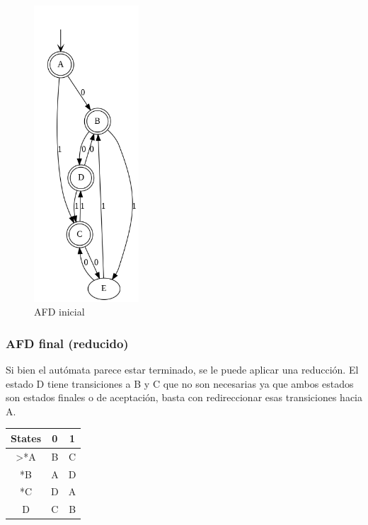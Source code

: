\documentclass[https://www.overleaf.com/project/63761df255a8a9f4a15c3579
	letterpaper, %
	10pt, %
]{CSUniSchoolLabReport}
\begin{document}
\begin{figure}[H]
	\centering
	\includegraphics[width=0.35\textwidth]{images/automata1.png}
    \caption{AFD inicial}
\end{figure}


\subsubsection*{AFD final (reducido)}
Si bien el autómata parece estar terminado, se le puede aplicar una reducción. El estado D tiene transiciones a B y C que no son necesarias ya que ambos estados son estados finales o de aceptación, basta con redireccionar esas transiciones hacia A.\\

\begin{tabular}{|c|c|c|}
\hline

States & 0 & 1 \\
\hline
>*A & B & C \\
\hline
*B & A & D \\
\hline
*C & D & A \\
\hline
D & C & B \\
\hline
\end{tabular}
\end{document}
